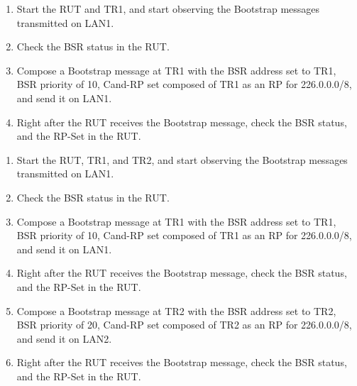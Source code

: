 \documentclass[11pt]{report}
\begin{document}
\begin{enumerate}

  \item Start the RUT and TR1, and start observing the Bootstrap messages
  transmitted on LAN1.

  \item Check the BSR status in the RUT.

  \item Compose a Bootstrap message at TR1 with the BSR address set to TR1,
  BSR priority of 10, Cand-RP set composed of TR1 as an RP for 226.0.0.0/8,
  and send it on LAN1.

  \item Right after the RUT receives the Bootstrap message, check the BSR
  status, and the RP-Set in the RUT.

\end{enumerate}


\begin{enumerate}

  \item Start the RUT, TR1, and TR2, and start observing the Bootstrap messages
  transmitted on LAN1.

  \item Check the BSR status in the RUT.

  \item Compose a Bootstrap message at TR1 with the BSR address set to TR1,
  BSR priority of 10, Cand-RP set composed of TR1 as an RP for 226.0.0.0/8,
  and send it on LAN1.

  \item Right after the RUT receives the Bootstrap message, check the BSR
  status, and the RP-Set in the RUT.

  \item Compose a Bootstrap message at TR2 with the BSR address set to TR2,
  BSR priority of 20, Cand-RP set composed of TR2 as an RP for 226.0.0.0/8,
  and send it on LAN2.

  \item Right after the RUT receives the Bootstrap message, check the BSR
  status, and the RP-Set in the RUT.

\end{enumerate}

\end{document}
